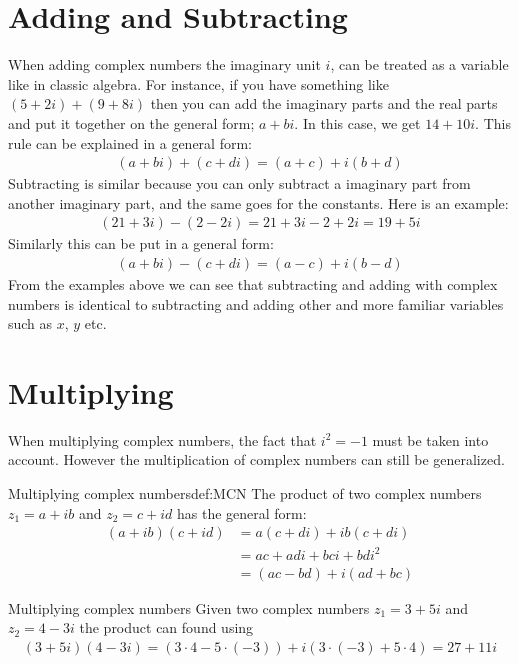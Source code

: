 \section{Adding and Subtracting}
When adding complex numbers the imaginary unit $i$, can be treated as a variable like in classic algebra. For instance, if you have something like $(5+2i)+(9+8i)$ then you can add the imaginary parts and the real parts and put it together on the general form; $a+bi$. In this case, we get $14+10i$. This rule can be explained in a general form: 
\begin{align*}
(a + bi) + (c + di) = (a + c) + i(b + d)
\end{align*}
Subtracting is similar because you can only subtract a imaginary part from another imaginary part, and the same goes for the constants. Here is an example:
\begin{align*}
(21 + 3i) - (2 - 2i) = 21 + 3i - 2 + 2i = 19 + 5i
\end{align*}
Similarly this can be put in a general form:
\begin{align*}
(a + bi) - (c + di) = (a - c) + i(b - d)
\end{align*}
From the examples above we can see that subtracting and adding with complex numbers is identical to subtracting and adding other and more familiar variables such as $x$, $y$ etc.

\section{Multiplying}
When multiplying complex numbers, the fact that $i^2 =-1$ must be taken into account. However the multiplication of complex numbers can still be generalized. 
\begin{definition}{Multiplying complex numbers}{def:MCN}
The product of two complex numbers $z_1=a+ib$ and $z_2=c+id$ has the general form:
\begin{align*}
(a+ib)(c+id)&=a(c+di)+ib(c+di)
\\
&=ac+adi+bci+bdi^2
\\
&=(ac-bd)+i(ad+bc)
\end{align*}
\end{definition}
\begin{example}{Multiplying complex numbers}{}
Given two complex numbers $z_1=3+5i$ and $z_2=4-3i$ the product can found using 
\begin{align*}
(3+5i)(4-3i) = (3\cdot4-5\cdot(-3))+i(3\cdot(-3)+5\cdot4)=27+11i
\end{align*}
\end{example}


